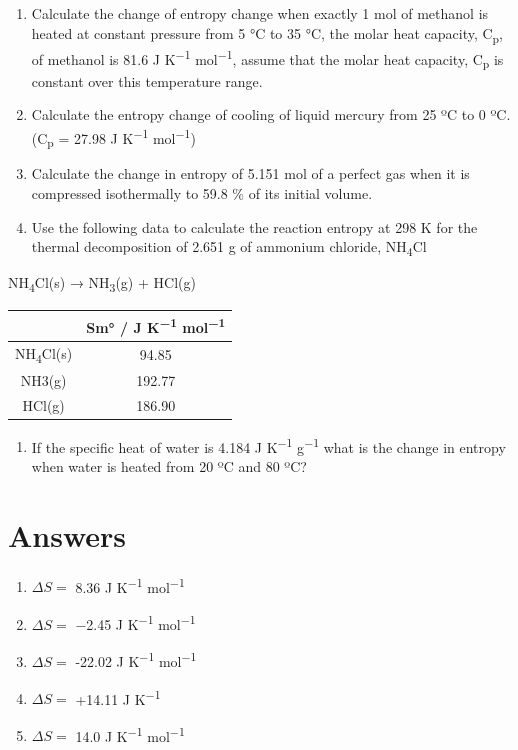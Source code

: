 \documentclass[
]{book}
\providecommand{\tightlist}{%
  \setlength{\itemsep}{0pt}\setlength{\parskip}{0pt}}
\begin{document}
\begin{enumerate}
\def\labelenumi{\arabic{enumi}.}
\item
  Calculate the change of entropy change when exactly 1 mol of methanol is heated at constant pressure from 5 °C to 35 °C, the molar heat capacity, C\textsubscript{p}, of methanol is 81.6 J K\textsuperscript{−1} mol\textsuperscript{−1}, assume that the molar heat capacity, C\textsubscript{p} is constant over this temperature range.
\item
  Calculate the entropy change of cooling of liquid mercury from 25 ºC to 0 ºC. (C\textsubscript{p} = 27.98 J K\textsuperscript{−1} mol\textsuperscript{−1})
\item
  Calculate the change in entropy of 5.151 mol of a perfect gas when it is compressed isothermally to 59.8 \% of its initial volume.
\item
  Use the following data to calculate the reaction entropy at 298 K for the thermal decomposition of 2.651 g of ammonium chloride, NH\textsubscript{4}Cl
\end{enumerate}

NH\textsubscript{4}Cl(s) → NH\textsubscript{3}(g) + HCl(g)

\begin{longtable}[]{@{}cc@{}}
\toprule
& Sm° / J K\textsuperscript{−1} mol\textsuperscript{−1}\tabularnewline
\midrule
\endhead
NH\textsubscript{4}Cl(s) & 94.85\tabularnewline
NH3(g) & 192.77\tabularnewline
HCl(g) & 186.90\tabularnewline
\bottomrule
\end{longtable}

\begin{enumerate}
\def\labelenumi{\arabic{enumi}.}
\setcounter{enumi}{4}
\tightlist
\item
  If the specific heat of water is 4.184 J K\textsuperscript{−1} g\textsuperscript{−1} what is the change in entropy when water is heated from 20 ºC and 80 ºC?
\end{enumerate}

\hypertarget{sec:w3p2ans}{%
\section{Answers}\label{sec:w3p2ans}}

\begin{enumerate}
\def\labelenumi{\arabic{enumi}.}
\item
  \(\Delta S=\) 8.36 J K\textsuperscript{−1} mol\textsuperscript{−1}
\item
  \(\Delta S=\) −2.45 J K\textsuperscript{−1} mol\textsuperscript{−1}
\item
  \(\Delta S=\) -22.02 J K\textsuperscript{−1} mol\textsuperscript{−1}
\item
  \(\Delta S=\) +14.11 J K\textsuperscript{−1}
\item
  \(\Delta S=\) 14.0 J K\textsuperscript{−1} mol\textsuperscript{−1}
\end{enumerate}
\end{document}
